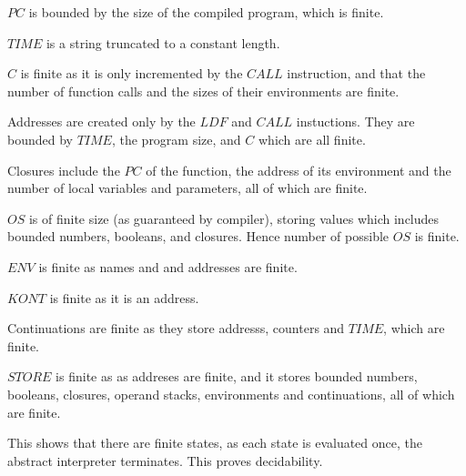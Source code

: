 \documentclass[12pt]{article}
\begin{document}
$PC$ is bounded by the size of the compiled program, which is finite. 

$TIME$ is a string truncated to a constant length.

$C$ is finite as it is only incremented by the $CALL$ instruction, and that the number of function calls and the sizes of their environments are finite.

Addresses are created only by the $LDF$ and $CALL$ instuctions. They are bounded by $TIME$, the program size, and $C$ which are all finite.

Closures include the $PC$ of the function, the address of its environment and the number of local variables and parameters, all of which are finite.

$OS$ is of finite size (as guaranteed by compiler), storing values which includes bounded numbers, booleans, and closures. Hence number of possible $OS$ is finite.

$ENV$ is finite as names and and addresses are finite.

$KONT$ is finite as it is an address.

Continuations are finite as they store addresss, counters and $TIME$, which are finite.

$STORE$ is finite as as addreses are finite, and it stores bounded numbers, booleans, closures, operand stacks, environments and continuations, all of which are finite.

This shows that there are finite states, as each state is evaluated once, the abstract interpreter terminates. This proves decidability.




\end{document}
